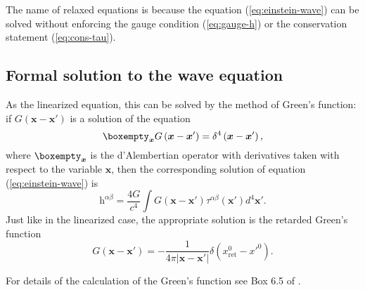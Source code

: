 The name of relaxed equations is because the equation (\ref{eq:einstein-wave})
can be solved without enforcing the gauge condition (\ref{eq:gauge-h})
or the conservation statement (\ref{eq:cons-tau}).

\subsection{Formal solution to the wave equation}

As the linearized equation, this can be solved by the method of Green's
function: if $G(\boldsymbol{x}-\boldsymbol{x}')$ is a solution of
the equation
\[
\boxempty_{\boldsymbol{x}}G\left(\boldsymbol{x}-\boldsymbol{x}'\right)=\delta^{4}\left(\boldsymbol{x}-\boldsymbol{x}'\right),
\]
where $\boxempty_{\boldsymbol{x}}$ is the d'Alembertian operator
with derivatives taken with respect to the variable $\boldsymbol{x}$,
then the corresponding solution of equation (\ref{eq:einstein-wave})
is
\[
\text{h}^{\alpha\beta}=\frac{4G}{c^{4}}\int G\left(\boldsymbol{x}-\boldsymbol{x}'\right)\tau^{\alpha\beta}\left(\boldsymbol{x}'\right)d^{4}\boldsymbol{x}'.
\]
Just like in the linearized case, the appropriate solution is the
retarded Green's function
\[
G\left(\boldsymbol{x}-\boldsymbol{x}'\right)=-\frac{1}{4\pi\left|\boldsymbol{x}-\boldsymbol{x}'\right|}\delta\left(x_{\text{ret}}^{0}-{x'}^{0}\right).
\]

For details of the calculation of the Green's function see Box 6.5 of \cite{POISSON}.
